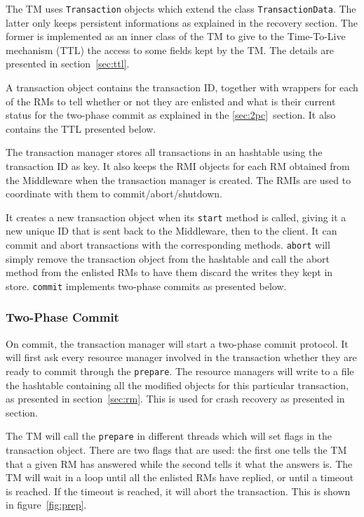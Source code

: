 \documentclass[12pt]{article}
\theoremstyle{plain}%
\theoremstyle{definition}
\theoremstyle{remark}
\newcommand{\java}[1]{{\lstinline!#1!}}
\begin{document}
The TM uses \java{Transaction} objects which extend the class 
\java{TransactionData}. The latter only keeps persistent informations
as explained in the recovery section. %
The former is implemented as an inner class of the TM to give to
the Time-To-Live mechanism (TTL) the access to some fields kept by
the TM. The details are presented in section~\ref{sec:ttl}.

A transaction object contains the transaction ID, together with wrappers
for each of the RMs to tell whether or not they are enlisted and what
is their current status for the two-phase commit as explained in the
\ref{sec:2pc}~section. It also contains the TTL presented below.

The transaction manager stores all transactions in an hashtable using 
the transaction ID as key. It also keeps the RMI objects for each RM 
obtained from the Middleware when the transaction manager is created. 
The RMIs are used to coordinate with them to commit/abort/shutdown.

It creates a new transaction object when its \java{start} method is 
called, giving it a new unique ID that is sent back to the Middleware, 
then to the client. It can commit and abort transactions with the 
corresponding methods. \java{abort} will simply remove the transaction 
object from the hashtable and call the abort method from the enlisted 
RMs to have them discard the writes they kept in store. \java{commit}
implements two-phase commits as presented below.

\subsubsection{Two-Phase Commit \label{sec:2pc}}

On commit, the transaction manager will start a two-phase commit
protocol. It will first ask every resource manager involved in the
transaction whether they are ready to commit through the \java{prepare}. 
The resource managers will write to a file the hashtable containing 
all the modified objects for this particular transaction, as presented 
in section~\ref{sec:rm}. This is used for crash recovery as presented
in section. %

The TM will call the \java{prepare} in different threads which will set 
flags in the transaction object. There are two flags that are used: the
first one tells the TM that a given RM has answered while the second
tells it what the answers is. The TM will wait in a loop until all
the enlisted RMs have replied, or until a timeout is reached. If the 
timeout is reached, it will abort the transaction. This is shown in
figure~\ref{fig:prep}.
\end{document}
